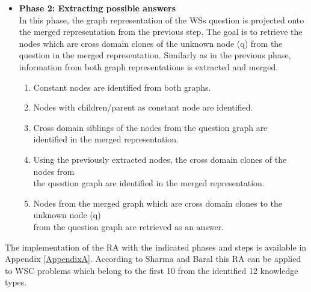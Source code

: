 \begin{itemize}
	\item \textbf{Phase 2: Extracting possible answers}\\
	In this phase, the graph representation of the WSs question is projected onto the merged representation from the previous step. The goal is to retrieve the nodes which are cross domain clones of the unknown node (q) from the question in the merged representation. Similarly as in the previous phase, information from both graph representations is extracted and merged.
	\begin{enumerate}
		\item Constant nodes are identified from both graphs.
		\item Nodes with children/parent as constant node are identified. 
		\item Cross domain siblings of the nodes from the question graph are \\ identified in the merged representation.
		\item Using the previously extracted nodes, the cross domain clones of the nodes from\\ the question graph are identified in the merged representation.
		\item Nodes from the merged graph which are cross domain clones to the unknown node (q)\\ from the question graph are retrieved as an answer.
	\end{enumerate}
\end{itemize}
The implementation of the RA with the indicated phases and steps is available in Appendix \ref{AppendixA}. 
According to Sharma and Baral \cite{2018CommonsenseKT} this RA can be applied to WSC problems which belong to the first 10 from the identified 12 knowledge types. 

